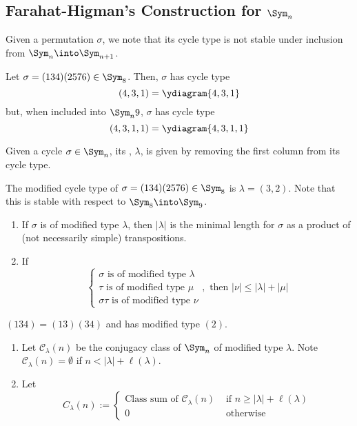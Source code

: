 \documentclass[11pt,leqno,oneside]{amsbook}
\newcommand{\CC}{\mathcal{C}} %
\numberwithin{thm}{section}
\begin{document}
\subsection{Farahat-Higman's Construction for \(\Sym_n\)}
Given a permutation \(\sigma\), we note that its cycle type is not
stable under inclusion from \(\Sym_n \into \Sym_{n+1}\).
\begin{example}
  Let \(\sigma = (134)(2576) \in \Sym_8\). Then, \(\sigma\) has cycle
  type \[
    (4,3,1) = \ydiagram{4,3,1}
  \]
  but, when included into \(\Sym_n9\), \(\sigma\) has cycle type \[
    (4,3,1,1) = \ydiagram{4,3,1,1}
  \]
\end{example}
\begin{defn}
  Given a cycle \(\sigma \in \Sym_n\), its ,
  \(\lambda\), is given by removing the first column from its cycle
  type. 
\end{defn}
\begin{example}
  The modified cycle type of \(\sigma = (134)(2576) \in \Sym_8\) is
  \(\lambda = (3,2)\). Note that this is stable with respect to
  \(\Sym_8 \into \Sym_9\).
\end{example}
\begin{prop}
  \begin{enumerate}
  \item If \(\sigma\) is of modified type \(\lambda\), then
    \(|\lambda|\) is the minimal length for \(\sigma\) as a product of
    (not necessarily simple) transpositions.
  \item If \[
      \begin{cases}
        \sigma \text{ is of modified type }\lambda\\
        \tau \text{ is of modified type }\mu\\
        \sigma\tau \text{ is of modified type }\nu
      \end{cases},
      \text{ then } |\nu| \leq |\lambda| + |\mu|
    \]
  \end{enumerate}
\end{prop}
\begin{example}
  \((134) = (13)(34)\) and has modified type \((2)\).
\end{example}
\begin{defn}
  \begin{enumerate}
  \item Let \(\CC_\lambda(n)\) be the conjugacy class of \(\Sym_n\) of
    modified type \(\lambda\). Note \(\CC_\lambda(n) = \emptyset\) if
    \(n < |\lambda|+\ell(\lambda)\).
  \item Let \[
      C_\lambda(n) :=
      \begin{cases}
        \text{Class sum of }\CC_\lambda(n) & \text{ if } n \geq
        |\lambda|+\ell(\lambda) \\
        0 & \text{ otherwise}
      \end{cases}
    \]
  \end{enumerate}
\end{defn}
\end{document}
